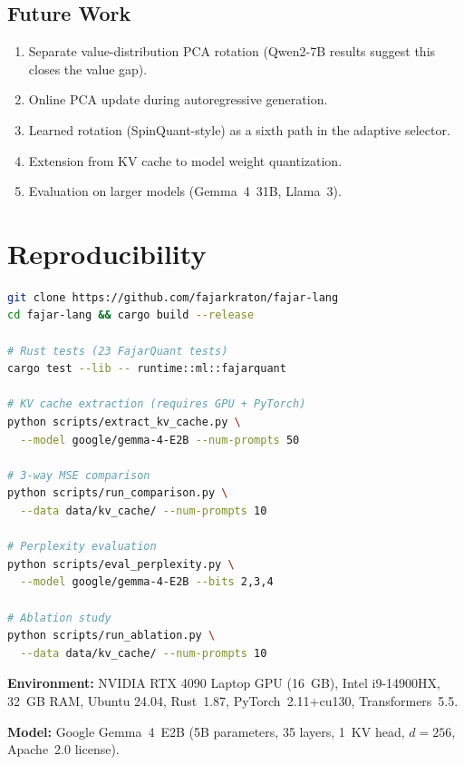 \documentclass{article}
\begin{document}
\subsection*{Future Work}
\begin{enumerate}[nosep]
\item Separate value-distribution PCA rotation (Qwen2-7B results suggest this closes the value gap).
\item Online PCA update during autoregressive generation.
\item Learned rotation (SpinQuant-style) as a sixth path in the adaptive selector.
\item Extension from KV cache to model weight quantization.
\item Evaluation on larger models (Gemma~4~31B, Llama~3).
\end{enumerate}

\clearpage
\appendix

\section{Reproducibility}
\label{sec:reprod}

\begin{lstlisting}[language=bash,caption={Reproducing all results}]
git clone https://github.com/fajarkraton/fajar-lang
cd fajar-lang && cargo build --release

# Rust tests (23 FajarQuant tests)
cargo test --lib -- runtime::ml::fajarquant

# KV cache extraction (requires GPU + PyTorch)
python scripts/extract_kv_cache.py \
  --model google/gemma-4-E2B --num-prompts 50

# 3-way MSE comparison
python scripts/run_comparison.py \
  --data data/kv_cache/ --num-prompts 10

# Perplexity evaluation
python scripts/eval_perplexity.py \
  --model google/gemma-4-E2B --bits 2,3,4

# Ablation study
python scripts/run_ablation.py \
  --data data/kv_cache/ --num-prompts 10
\end{lstlisting}

\textbf{Environment:} NVIDIA RTX 4090 Laptop GPU (16~GB), Intel i9-14900HX, 32~GB RAM, Ubuntu 24.04, Rust~1.87, PyTorch~2.11+cu130, Transformers~5.5.

\textbf{Model:} Google Gemma~4~E2B (5B parameters, 35 layers, 1~KV head, $d{=}256$, Apache~2.0 license).
\end{document}
